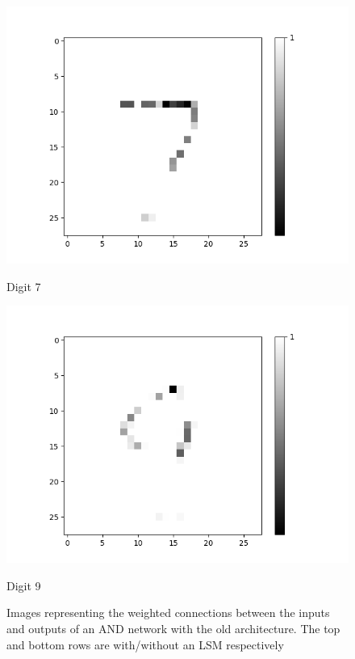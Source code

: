 \begin{figure}[H]
\begin{minipage}[b]{0.19\textwidth}
		\includegraphics[width=\textwidth]{AND-OLD(NO-LSM)/Layer0-Neuron-7.png}
		\caption{Digit 7}
	\end{minipage}
	\begin{minipage}[b]{0.19\textwidth}
		\captionsetup{labelformat=empty}
		\includegraphics[width=\textwidth]{AND-OLD(NO-LSM)/Layer0-Neuron-9.png}
		\caption{Digit 9}
	\end{minipage}
	\hfill
	\caption{Images representing the weighted connections between the inputs and outputs of an AND network with the old architecture. The top and bottom rows are with/without an LSM respectively}
	\label{fig:and-net-old-archetchure-interp}
\end{figure}

